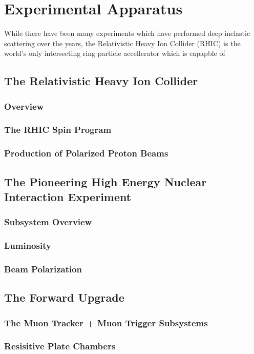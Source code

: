 \chapter{Experimental Apparatus}
While there have been many experiments which have performed deep inelastic
scattering over the years, the Relativistic Heavy Ion Collider (RHIC) is the
world's only intersecting ring particle accellerator which is capapble of 
\section{The Relativistic Heavy Ion Collider}
\subsection{Overview}
\subsection{The RHIC Spin Program}
\subsection{Production of Polarized Proton Beams}
\section{The Pioneering High Energy Nuclear Interaction Experiment}
\subsection{Subsystem Overview}
\subsection{Luminosity}
\subsection{Beam Polarization}
\section{The Forward Upgrade}
\subsection{The Muon Tracker + Muon Trigger Subsystems}
\subsection{Resisitive Plate Chambers}
